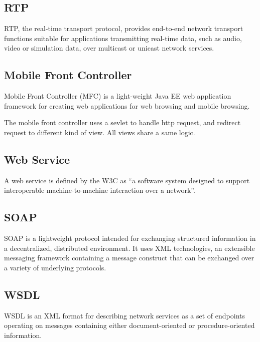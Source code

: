 \subsection*{RTP}
\label{sec:RTP}
\label{sym:RTP}

RTP, the real-time transport protocol, provides end-to-end network transport functions suitable for applications transmitting real-time data, such as audio, video or simulation data, over multicast or unicast network services.\cite{RFC3550}

\subsection*{Mobile Front Controller}
\label{sec:MobileFrontController}
\label{MFC}

Mobile Front Controller (MFC) is a light-weight Java EE web application framework for creating web applications for web browsing and mobile browsing. \cite{MobileFrontController}

The mobile front controller uses a sevlet to handle http request, and redirect request to different kind of view. All views share a same logic. 

\subsection*{Web Service}
\label{sec:WebService}

A web service is defined by the W3C as ``a software system designed to support interoperable machine-to-machine interaction over a network''.\cite{WebServicesGlossary}

\subsection*{SOAP}
\label{sec:SOAP}
\label{sym:SOAP}

SOAP is a lightweight protocol intended for exchanging structured information in a decentralized, distributed environment. It uses XML technologies, an extensible messaging framework containing a message construct that can be exchanged over a variety of underlying protocols.\cite{SOAPVersion1dot2}

\subsection*{WSDL}
\label{sec:WSDL}
\label{sym:WSDL}

WSDL is an XML format for describing network services as a set of endpoints operating on messages containing either document-oriented or procedure-oriented information.\cite{WSDL1dot1} 


